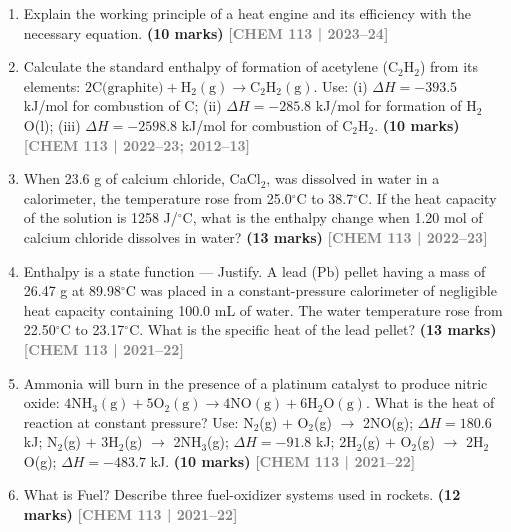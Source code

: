 \documentclass[12pt,a3paper]{article}
\newcommand{\yr}[1]{\hfill\textcolor{gray}{\small\textbf{[#1]}}}
\newcommand{\mk}[1]{\textcolor{orange!70!black}{\small\textbf{(#1 marks)}}}
\begin{document}
\begin{enumerate}
\item Explain the working principle of a heat engine and its efficiency with the necessary equation. \mk{10}
\yr{CHEM 113 | 2023--24}



\item Calculate the standard enthalpy of formation of acetylene (C$_2$H$_2$) from its elements: $2\text{C(graphite)} + \text{H}_2(\text{g}) \rightarrow \text{C}_2\text{H}_2(\text{g})$. Use: (i) $\Delta H = -393.5$ kJ/mol for combustion of C; (ii) $\Delta H = -285.8$ kJ/mol for formation of H$_2$O(l); (iii) $\Delta H = -2598.8$ kJ/mol for combustion of C$_2$H$_2$. \mk{10}
\yr{CHEM 113 | 2022--23; 2012--13}



\item When 23.6 g of calcium chloride, CaCl$_2$, was dissolved in water in a calorimeter, the temperature rose from 25.0$^\circ$C to 38.7$^\circ$C. If the heat capacity of the solution is 1258 J/$^\circ$C, what is the enthalpy change when 1.20 mol of calcium chloride dissolves in water? \mk{13}
\yr{CHEM 113 | 2022--23}



\item Enthalpy is a state function --- Justify. A lead (Pb) pellet having a mass of 26.47 g at 89.98$^\circ$C was placed in a constant-pressure calorimeter of negligible heat capacity containing 100.0 mL of water. The water temperature rose from 22.50$^\circ$C to 23.17$^\circ$C. What is the specific heat of the lead pellet? \mk{13}
\yr{CHEM 113 | 2021--22}



\item Ammonia will burn in the presence of a platinum catalyst to produce nitric oxide:
$4\text{NH}_3(\text{g}) + 5\text{O}_2(\text{g}) \rightarrow 4\text{NO}(\text{g}) + 6\text{H}_2\text{O}(\text{g})$.
What is the heat of reaction at constant pressure? Use: N$_2$(g) + O$_2$(g) $\rightarrow$ 2NO(g); $\Delta H = 180.6$ kJ; N$_2$(g) + 3H$_2$(g) $\rightarrow$ 2NH$_3$(g); $\Delta H = -91.8$ kJ; 2H$_2$(g) + O$_2$(g) $\rightarrow$ 2H$_2$O(g); $\Delta H = -483.7$ kJ. \mk{10}
\yr{CHEM 113 | 2021--22}



\item What is Fuel? Describe three fuel-oxidizer systems used in rockets. \mk{12}
\yr{CHEM 113 | 2021--22}




\end{enumerate}
\end{document}
